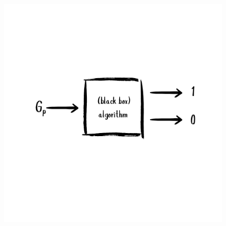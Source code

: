 \begin{frame}
\begin{columns}
    \begin{column}{0.4\textwidth}
      \begin{figure}
        \centering
        \includegraphics[width=\linewidth]{figures/lec/optmi.png}
      \end{figure}
    \end{column}
  \end{columns}
\end{frame}
